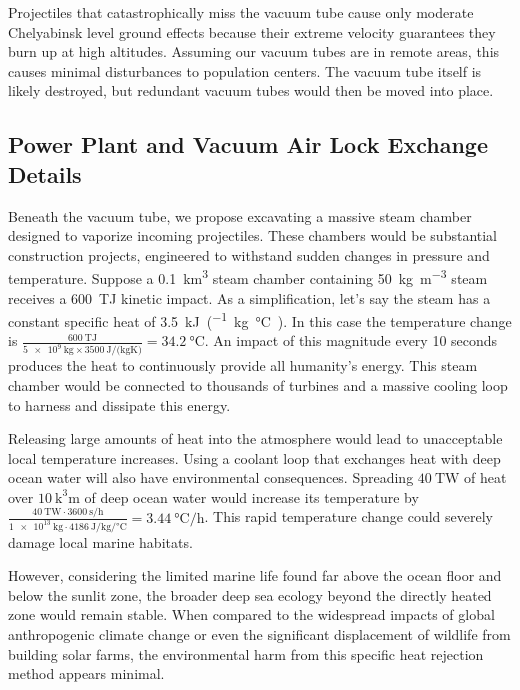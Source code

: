 \documentclass{article}
\begin{document}
Projectiles that catastrophically miss the vacuum tube cause only moderate Chelyabinsk level \cite{popova2021chelyabinsk} ground effects because their extreme velocity guarantees they burn up at high altitudes.   Assuming our vacuum tubes are in remote areas, this causes minimal disturbances to population centers.   The vacuum tube itself is likely destroyed, but redundant vacuum tubes would then be moved into place.

\subsection{Power Plant and Vacuum Air Lock Exchange Details}
Beneath the vacuum tube, we propose excavating a massive steam chamber designed to vaporize incoming projectiles. These chambers would be substantial construction projects, engineered to withstand sudden changes in pressure and temperature.  Suppose a \SI{0.1}{\cubic\kilo\meter} steam chamber containing \SI{50}{\kilo\gram\per\cubic\meter} steam receives a \SI{600}{\tera\joule} kinetic impact.   As a simplification, let's say the steam has a constant specific heat of \SI{3.5}{\kilo\joule\per(\kilo\gram\celsius)}.  In this case the temperature change is 
$\frac{\SI{600}{\tera\joule}}{\SI{5e9}{\kilo\gram}\times\SI{3500}{\joule\per(\kilo\gram\kelvin)}} = \SI{34.2}{\celsius}$.  An impact of this magnitude every 10 seconds produces the heat to continuously provide all humanity's energy.  This steam chamber would be connected to thousands of turbines and a massive cooling loop to harness and dissipate this energy.  

Releasing large amounts of heat into the atmosphere would lead to unacceptable local temperature increases. Using a coolant loop that exchanges heat with deep ocean water will also have environmental consequences. Spreading $\SI{40}{\tera\watt}$ of heat over $\SI{10}{\cubic\kilo\meter}$ of deep ocean water would increase its temperature by $\frac{\SI{40}{\tera\watt}\cdot\SI{3600}{\second\per\hour}}{\SI{1e13}{\kilo\gram}\cdot\SI{4186}{\joule\per\kilo\gram\per\celsius}} = \SI{3.44}{\celsius\per\hour}$.  This rapid temperature change could severely damage local marine habitats.

However, considering the limited marine life found far above the ocean floor and below the sunlit zone, the broader deep sea ecology beyond the directly heated zone would remain stable. When compared to the widespread impacts of global anthropogenic climate change or even the significant displacement of wildlife from building solar farms, the environmental harm from this specific heat rejection method appears minimal.
\end{document}
